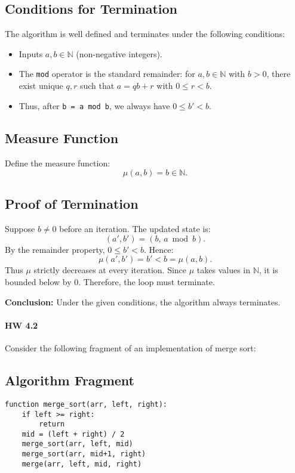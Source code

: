 \documentclass{article}
\theoremstyle{theorem}
\theoremstyle{definition}
\theoremstyle{remark}
\begin{document}
\subsection*{Conditions for Termination}
The algorithm is well defined and terminates under the following conditions:
\begin{itemize}
    \item Inputs $a, b \in \mathbb{N}$ (non-negative integers).
    \item The \texttt{mod} operator is the standard remainder: for $a, b \in \mathbb{N}$ with $b > 0$, there exist unique $q, r$ such that $a = qb + r$ with $0 \leq r < b$.
    \item Thus, after \texttt{b = a mod b}, we always have $0 \leq b' < b$.
\end{itemize}

\subsection*{Measure Function}
Define the measure function:
\[
\mu(a,b) = b \in \mathbb{N}.
\]

\subsection*{Proof of Termination}
Suppose $b \neq 0$ before an iteration. The updated state is:
\[
(a', b') = (b,\, a \bmod b).
\]
By the remainder property, $0 \leq b' < b$. Hence:
\[
\mu(a', b') = b' < b = \mu(a,b).
\]
Thus $\mu$ strictly decreases at every iteration. Since $\mu$ takes values in $\mathbb{N}$, it is bounded below by $0$. Therefore, the loop must terminate.  

\noindent \textbf{Conclusion:} Under the given conditions, the algorithm always terminates.

\paragraph{HW 4.2}
Consider the following fragment of an implementation of merge sort:
\subsection*{Algorithm Fragment}
\begin{verbatim}
function merge_sort(arr, left, right):
    if left >= right:
        return
    mid = (left + right) / 2
    merge_sort(arr, left, mid)
    merge_sort(arr, mid+1, right)
    merge(arr, left, mid, right)
\end{verbatim}
\end{document}
